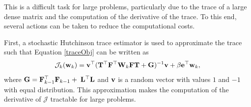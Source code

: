 \documentclass[12pt]{article}
\newcommand{\bfF}	{{\bf{F}}}
\newcommand{\bfG}	{{\bf{G}}}
\newcommand{\bfL}	{{\bf{L}}}
\newcommand{\bfT}	{{\bf{T}}}
\newcommand{\bfW}	{{\bf{W}}}
\newcommand{\bfe}	{{\bf{e}}}
\newcommand{\bfv}	{{\bf{v}}}
\newcommand{\bfw}	{{\bf{w}}}
\newcommand{\LtL}       { \bfL^{\top}\bfL}
\newcommand{\JJ} 	 {\mathcal{J}}    %
\begin{document}
This is a difficult task for large problems, particularly due to the trace of a large dense matrix and the computation of the derivative of the trace. To this end, several actions can be taken to reduce the computational costs.

First, a stochastic Hutchinson trace estimator is used to approximate the trace  \cite{Hutchinson1989} such that Equation \eqref{traceObj} can be written as
\begin{equation}
\label{Obj}
\JJ_k(\bfw_k) = \bfv^{\top}(\bfT^{\top} \bfF^{\top} \bfW_k \bfF \bfT  + \bfG)^{-1}\bfv + \beta \bfe^{\top}\bfw_k,
\end{equation}
where $\bfG = \bfF_{k-1}^{\top}\bfF_{k-1} + \;\LtL$ and $\bfv$ is a random vector with values $1$ and $-1$ with equal distribution. This approximation makes the computation of the derivative of $\JJ$ tractable for large problems. \\
\end{document}
